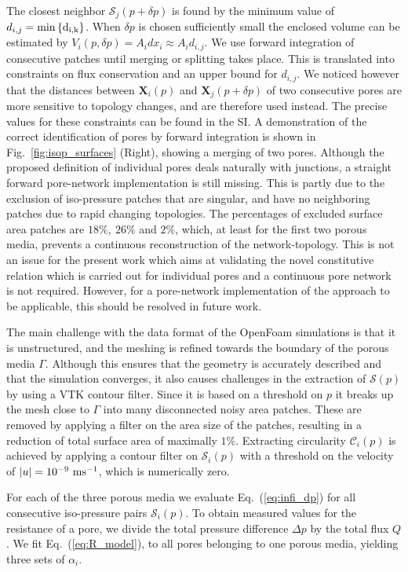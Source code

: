 \documentclass[draft]{agujournal2019}
\begin{document}
The closest neighbor $\mathcal{S}_j(p+\delta p)$ is found by the minimum value of $d_{i,j} = \rm{min}\left\{ d_{i,k}\right\}$. When $\delta p$ is chosen sufficiently small the enclosed volume can be estimated by $V_i(p,\delta p)=A_id x_i \approx A_i d_{i,j}$. We use forward integration of consecutive patches until merging or splitting takes place. This is translated into constraints on flux conservation and an upper bound for $d_{i,j}$. We noticed however that the distances between $\mathbf{X}_i(p)$ and $\mathbf{X}_j(p+\delta p)$ of two consecutive pores are more sensitive to topology changes, and are therefore used instead. The precise values for these constraints can be found in the SI. A demonstration of the correct identification of pores by forward integration is shown in Fig.~\ref{fig:isop_surfaces} (Right), showing a merging of two pores. Although the proposed definition of individual pores deals naturally with junctions, a straight forward pore-network implementation is still missing. This is partly due to the exclusion of iso-pressure patches that are singular, and have no neighboring patches due to rapid changing topologies. The percentages of excluded surface area patches are $18 \%,~26 \%$ and $2\%$, which, at least for the first two porous media, prevents a continuous reconstruction of the network-topology. This is not an issue for the present work which aims at validating the novel constitutive relation which is carried out for individual pores and a continuous pore network is not required. However, for a pore-network implementation of the approach to be applicable, this should be resolved in future work.

The main challenge with the data format of the OpenFoam simulations is that it is unstructured, and the meshing is refined towards the boundary of the porous media $\Gamma$. Although this ensures that the geometry is accurately described and that the simulation converges, it also causes challenges in the extraction of $\mathcal{S}(p)$ by using a VTK contour filter. Since it is based on a threshold on $p$ it breaks up the mesh close to $\Gamma$ into many disconnected noisy area patches. These are removed by applying a filter on the area size of the patches, resulting in a reduction of total surface area of maximally $1\%$. Extracting circularity $\mathcal{C}_i(p)$ is achieved by applying a contour filter on $\mathcal{S}_i(p)$ with a threshold on the velocity of $|u| = 10^{-9} ~\rm{ms^{-1}}$, which is numerically zero.

For each of the three porous media we evaluate Eq.~(\ref{eq:infi_dp}) for all consecutive iso-pressure pairs $\mathcal{S}_i(p)$. To obtain measured values for the resistance of a pore, we divide the total pressure difference $\Delta p$ by the total flux $Q$. We fit Eq.~(\ref{eq:R_model}), to all pores belonging to one porous media, yielding three sets of $\alpha_i$.  
\end{document}
